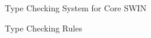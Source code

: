 \begin{section}{Type Checking System for Core SWIN}
\begin{subsection}{Type Checking Rules}
  
  







\end{subsection}
\end{section}
